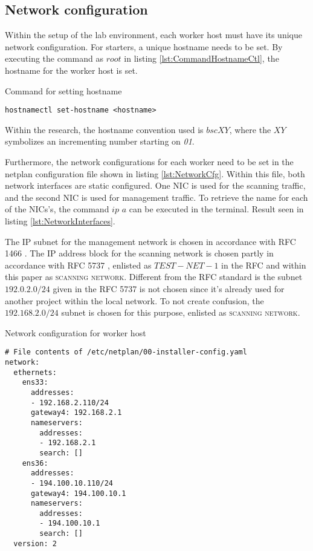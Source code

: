 \subsection{Network configuration}
\label{ss:WorkerNetworkConfiguration}
Within the setup of the lab environment, each worker host must have its unique network configuration.
For starters, a unique hostname needs to be set.
By executing the command as $root$ in listing \ref{lst:CommandHostnameCtl}, the hostname for the worker host is set.
\begin{listing}[!ht]
\caption{Command for setting hostname}
\label{lst:CommandHostnameCtl}
\begin{verbatim}
hostnamectl set-hostname <hostname>
\end{verbatim}
\end{listing}

Within the research, the hostname convention used is $bscXY$, where the $XY$ symbolizes an incrementing number starting on \textit{01}.

Furthermore, the network configurations for each worker need to be set in the netplan configuration file shown in listing \ref{lst:NetworkCfg}. Within this file, both network interfaces are static configured. One NIC is used for the scanning traffic, and the second NIC is used for management traffic. To retrieve the name for each of the NICs's, the command $ip$ $a$ can be executed in the terminal. Result seen in listing \ref{lst:NetworkInterfaces}.

The IP subnet for the management network is chosen in accordance with RFC 1466 \autocite{rfc1466}.
The IP address block for the scanning network is chosen partly in accordance with RFC 5737 \autocite{rfc5737}, enlisted as $TEST-NET-1$ in the RFC and within this paper as \textsc{scanning network}. Different from the RFC standard is the subnet $192.0.2.0/24$ given in the RFC 5737 is not chosen since it's already used for another project within the local network.
To not create confusion, the $192.168.2.0/24$ subnet is chosen for this purpose, enlisted as \textsc{scanning network}.



\begin{listing}[!ht]
\caption{Network configuration for worker host}
\label{lst:NetworkCfg}
\begin{verbatim}
# File contents of /etc/netplan/00-installer-config.yaml
network:
  ethernets:
    ens33:
      addresses:
      - 192.168.2.110/24
      gateway4: 192.168.2.1
      nameservers:
        addresses:
        - 192.168.2.1
        search: []
    ens36:
      addresses:
      - 194.100.10.110/24
      gateway4: 194.100.10.1
      nameservers:
        addresses:
        - 194.100.10.1
        search: []
  version: 2
\end{verbatim}
\end{listing}

